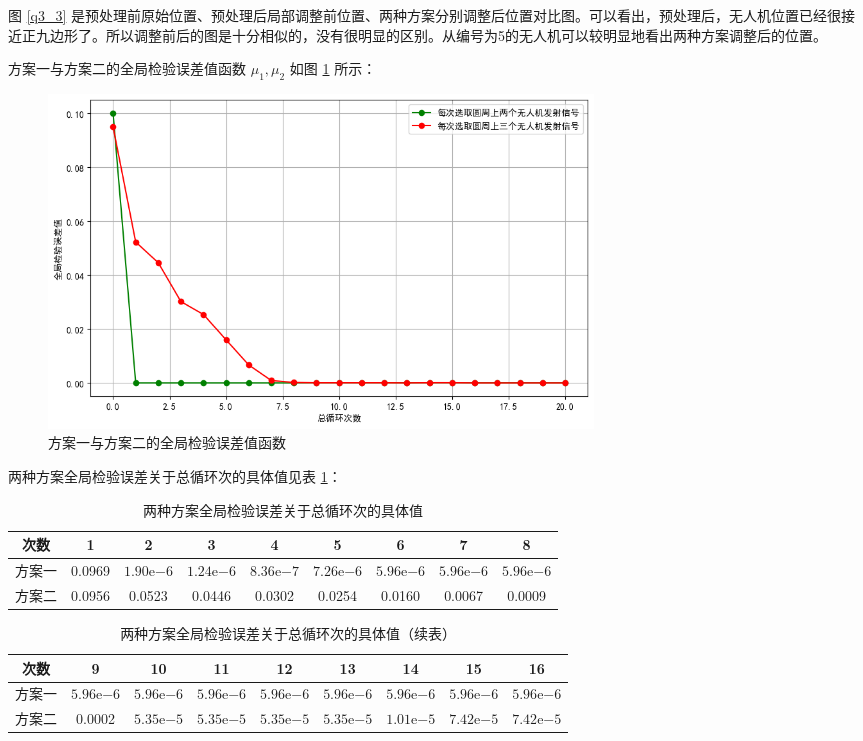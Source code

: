 \documentclass[withoutpreface,bwprint]{cumcmthesis} %
\begin{document}
图 \ref{q3_3} 是预处理前原始位置、预处理后局部调整前位置、两种方案分别调整后位置对比图。可以看出，预处理后，无人机位置已经很接近正九边形了。所以调整前后的图是十分相似的，没有很明显的区别。从编号为5的无人机可以较明显地看出两种方案调整后的位置。

方案一与方案二的全局检验误差值函数 \( \mu_1, \mu_2 \) 如图 \ref{q3_4} 所示：

\begin{figure}[htbp]
  \centering
  \includegraphics[width=0.7\textwidth]{../../figure/q3_4.png} %
  \caption{方案一与方案二的全局检验误差值函数}
  \label{q3_4}
\end{figure}

两种方案全局检验误差关于总循环次的具体值见表 \ref{tab:error_cycle}：

\begin{table}[htbp]
  \centering
  \caption{两种方案全局检验误差关于总循环次的具体值}
  \label{tab:error_cycle}
  \begin{tabular}{ccccccccc}
    \toprule
    次数 & 1 & 2 & 3 & 4 & 5 & 6 & 7 & 8 \\
    \midrule
    方案一 & 0.0969 & $1.90\mathrm{e}{-6}$ & $1.24\mathrm{e}{-6}$ & $8.36\mathrm{e}{-7}$ & $7.26\mathrm{e}{-6}$ & $5.96\mathrm{e}{-6}$ & $5.96\mathrm{e}{-6}$ & $5.96\mathrm{e}{-6}$ \\
    方案二 & 0.0956 & 0.0523 & 0.0446 & 0.0302 & 0.0254 & 0.0160 & 0.0067 & 0.0009 \\
    \bottomrule
  \end{tabular}
\end{table}

\begin{table}[htbp]
  \centering
  \caption{两种方案全局检验误差关于总循环次的具体值（续表）}
  \label{tab:error_cycle_continue}
  \begin{tabular}{ccccccccc}
    \toprule
    次数 & 9 & 10 & 11 & 12 & 13 & 14 & 15 & 16 \\
    \midrule
    方案一 & $5.96\mathrm{e}{-6}$ & $5.96\mathrm{e}{-6}$ & $5.96\mathrm{e}{-6}$ & $5.96\mathrm{e}{-6}$ & $5.96\mathrm{e}{-6}$ & $5.96\mathrm{e}{-6}$ & $5.96\mathrm{e}{-6}$ & $5.96\mathrm{e}{-6}$ \\
    方案二 & 0.0002 & $5.35\mathrm{e}{-5}$ & $5.35\mathrm{e}{-5}$ & $5.35\mathrm{e}{-5}$ & $5.35\mathrm{e}{-5}$ & $1.01\mathrm{e}{-5}$ & $7.42\mathrm{e}{-5}$ & $7.42\mathrm{e}{-5}$ \\
    \bottomrule
  \end{tabular}
\end{table}
\end{document}
